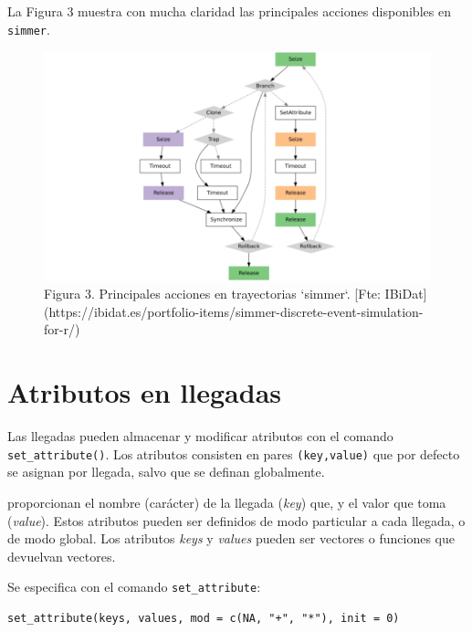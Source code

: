 \documentclass[
]{book}
\theoremstyle{definition}
\theoremstyle{definition}
\theoremstyle{definition}
\theoremstyle{definition}
\theoremstyle{remark}
\begin{document}
La Figura 3 muestra con mucha claridad las principales acciones disponibles en \texttt{simmer}.

\begin{figure}

{\centering \includegraphics[width=1\linewidth]{images/simmer_trajectory} 

}

\caption{Figura 3. Principales acciones en trayectorias `simmer`. [Fte: IBiDat](https://ibidat.es/portfolio-items/simmer-discrete-event-simulation-for-r/)}\label{fig:simmertray}
\end{figure}

\hypertarget{atributos-en-llegadas}{%
\section{Atributos en llegadas}\label{atributos-en-llegadas}}

Las llegadas pueden almacenar y modificar atributos con el comando \texttt{set\_attribute()}. Los atributos consisten en pares \texttt{(key,value)} que por defecto se asignan por llegada, salvo que se definan globalmente.

proporcionan el nombre (carácter) de la llegada (\emph{key}) que, y el valor que toma (\emph{value}). Estos atributos pueden ser definidos de modo particular a cada llegada, o de modo global. Los atributos \emph{keys} y \emph{values} pueden ser vectores o funciones que devuelvan vectores.

Se especifica con el comando \texttt{set\_attribute}:

\begin{verbatim}
set_attribute(keys, values, mod = c(NA, "+", "*"), init = 0)
\end{verbatim}
\end{document}
